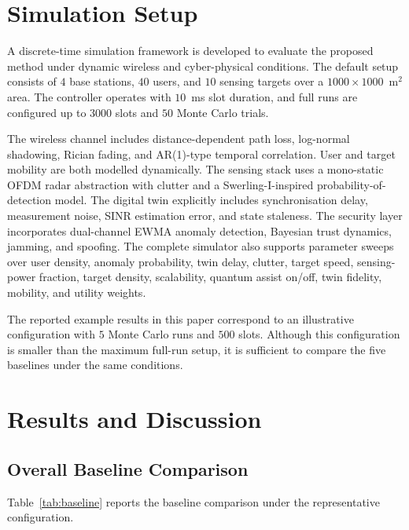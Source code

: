 \documentclass[10pt,journal]{IEEEtran}
\begin{document}
\section{Simulation Setup}
\label{sec:simulation}
A discrete-time simulation framework is developed to evaluate the proposed method under dynamic wireless and cyber-physical conditions. The default setup consists of \(4\) base stations, \(40\) users, and \(10\) sensing targets over a \(1000\times1000\)~m\(^2\) area. The controller operates with \(10\)~ms slot duration, and full runs are configured up to \(3000\) slots and \(50\) Monte Carlo trials.

The wireless channel includes distance-dependent path loss, log-normal shadowing, Rician fading, and AR(1)-type temporal correlation. User and target mobility are both modelled dynamically. The sensing stack uses a mono-static OFDM radar abstraction with clutter and a Swerling-I-inspired probability-of-detection model. The digital twin explicitly includes synchronisation delay, measurement noise, SINR estimation error, and state staleness. The security layer incorporates dual-channel EWMA anomaly detection, Bayesian trust dynamics, jamming, and spoofing. The complete simulator also supports parameter sweeps over user density, anomaly probability, twin delay, clutter, target speed, sensing-power fraction, target density, scalability, quantum assist on/off, twin fidelity, mobility, and utility weights.

The reported example results in this paper correspond to an illustrative configuration with \(5\) Monte Carlo runs and \(500\) slots. Although this configuration is smaller than the maximum full-run setup, it is sufficient to compare the five baselines under the same conditions.

\section{Results and Discussion}
\label{sec:results}

\subsection{Overall Baseline Comparison}
Table~\ref{tab:baseline} reports the baseline comparison under the representative configuration.
\end{document}
